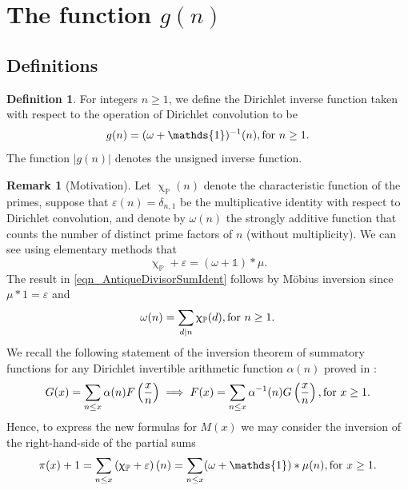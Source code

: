 \documentclass[11pt,reqno,a4letter]{article}
\numberwithin{equation}{section}
\numberwithin{figure}{section}
\numberwithin{table}{section}
\renewcommand{\chi}{\upchi}
\theoremstyle{plain}
\numberwithin{theorem}{section}
\theoremstyle{definition}
\newtheorem{remark}[theorem]{Remark}
\newtheorem{definition}[theorem]{Definition}
\theoremstyle{remark}
\newcommand{\mathtext}[1]{\text{\rm #1}}
\begin{document}
\section{The function $g(n)$} 
\label{Section_NewFormulasForgInvn_v2} 

\subsection{Definitions}

\begin{definition}
\label{def_gn_and_Absgn_v2} 
For integers $n \geq 1$, we define the Dirichlet inverse function 
taken with respect to the operation of Dirichlet convolution to be 
\[
g(n) = (\omega + \mathds{1})^{-1}(n), \mathtext{ for } n \geq 1. 
\]
The function $|g(n)|$ denotes the unsigned inverse function. 
\end{definition}

\begin{remark}[Motivation] 
\label{remark_MotivationForTheDefinitionOf_gn_v2}
Let $\chi_{\mathbb{P}}(n)$ denote the characteristic function of the primes, suppose that 
$\varepsilon(n) = \delta_{n,1}$ be the multiplicative identity 
with respect to Dirichlet convolution, 
and denote by $\omega(n)$ the strongly additive function that counts the number of 
distinct prime factors of $n$ (without multiplicity). 
We can see using elementary methods that 
\begin{equation}
\label{eqn_AntiqueDivisorSumIdent} 
\chi_{\mathbb{P}} + \varepsilon = (\omega + \mathds{1}) \ast \mu. 
\end{equation} 
The result in \eqref{eqn_AntiqueDivisorSumIdent} follows by M\"obius inversion 
since $\mu \ast 1 = \varepsilon$ and 
\[
\omega(n) = \sum_{d|n} \chi_{\mathbb{P}}(d), \mathtext{ for } n \geq 1. 
\]
We recall the following statement of the 
inversion theorem of summatory functions for any 
Dirichlet invertible arithmetic function $\alpha(n)$ 
proved in \cite[\S 2.14]{APOSTOLANUMT}:
\begin{equation}
\label{eqn_ApostolStmt_ClassicSummatoryFuncInvThm_v1} 
G(x) = \sum_{n \leq x} \alpha(n) F\left(\frac{x}{n}\right) \implies 
     F(x) = \sum_{n \leq x} \alpha^{-1}(n) G\left(\frac{x}{n}\right), 
     \mathtext{ for } x \geq 1. 
\end{equation}
Hence, to express the new formulas for $M(x)$ 
we may consider the inversion of the right-hand-side of the partial sums 
\[
\pi(x) + 1 = \sum_{n \leq x} \left(\chi_{\mathbb{P}} + \varepsilon\right)(n) = 
	\sum_{n \leq x} (\omega + \mathds{1}) \ast \mu(n), 
	\mathtext{ for } x \geq 1. 
\]
\end{remark}
\end{document}
